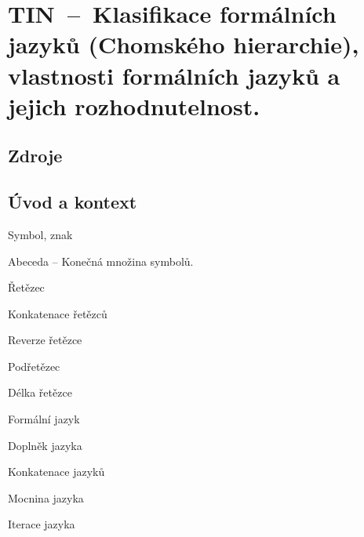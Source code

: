 

\graphicspath{{tin/klasifikace_jazyku/figures}}


\chapter{TIN~--~Klasifikace formálních jazyků (Chomského hierarchie), vlastnosti formálních jazyků a jejich rozhodnutelnost.}



\section{Zdroje}

\begin{compactitem}
    \item {}
    \item {}
    \item {}
    \item {}
    \item {}
\end{compactitem}


\section{Úvod a kontext}

\begin{compactitem}
    \item Symbol, znak
    \item Abeceda -- Konečná množina symbolů.
    \item Řetězec
    \item Konkatenace řetězců
    \item Reverze řetězce
    \item Podřetězec
    \item Délka řetězce
    \item Formální jazyk
    \item Doplněk jazyka
    \item Konkatenace jazyků
    \item Mocnina jazyka
    \item Iterace jazyka
\end{compactitem}

